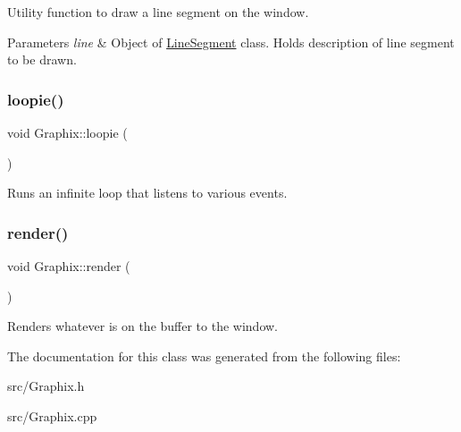 Utility function to draw a line segment on the window. 
\begin{DoxyParams}{Parameters}
{\em line} & Object of \hyperlink{classLineSegment}{Line\+Segment} class. Holds description of line segment to be drawn. \\
\hline
\end{DoxyParams}
\mbox{\label{classGraphix_af7b539b3ab40274dc2f89d060cba0c51}} 
\subsubsection{\texorpdfstring{loopie()}{loopie()}}
{\footnotesize\ttfamily void Graphix\+::loopie (\begin{DoxyParamCaption}{ }\end{DoxyParamCaption})}

Runs an infinite loop that listens to various events. \mbox{\label{classGraphix_a3e24075d5ded3741a9c14a7978b721d8}} 
\subsubsection{\texorpdfstring{render()}{render()}}
{\footnotesize\ttfamily void Graphix\+::render (\begin{DoxyParamCaption}{ }\end{DoxyParamCaption})}

Renders whatever is on the buffer to the window. 

The documentation for this class was generated from the following files\+:\begin{DoxyCompactItemize}
\item 
src/Graphix.\+h\item 
src/Graphix.\+cpp\end{DoxyCompactItemize}
